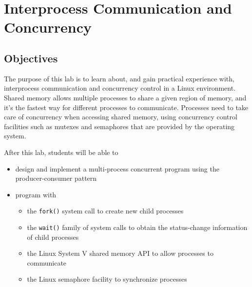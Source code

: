 \chapter{Interprocess Communication and Concurrency}

\section{Objectives}

The purpose of this lab is to learn about, and gain practical experience with,
interprocess communication and concurrency control in a Linux environment.
Shared memory allows multiple processes to share a given region of memory, and it's the fastest way for different processes to communicate.
Processes need to take care of concurrency when accessing shared memory, using concurrency control facilities such as mutexes and semaphores that are provided by the operating system.
 

After this lab, students will be able to
\begin{itemize}
\item design and implement a multi-process concurrent program using the producer-consumer pattern
\item program with
        \begin{itemize}
	\item the \verb+fork()+ system call to create new child processes
	\item the \verb+wait()+ family of system calls to obtain
	          the status-change information of child processes
        \item the Linux System V shared memory API to allow processes to communicate
        \item the Linux semaphore facility to synchronize processes
        \end{itemize}              
\end{itemize}

